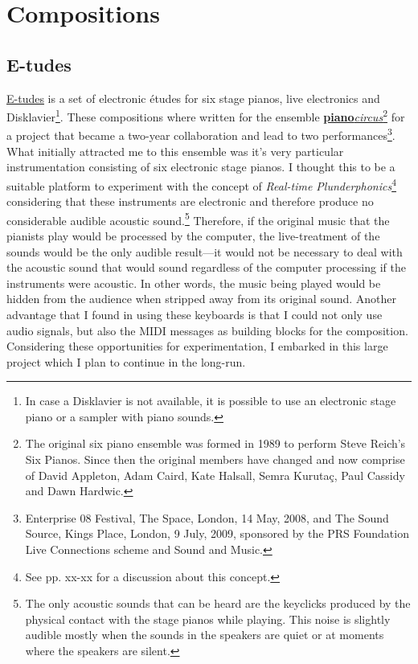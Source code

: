 \hypertarget{chapter5}{}
\chapter{Compositions}

\section{E-tudes}

\href{http://www.ranchonotorious.org/freuben/e-tudes}{E-tudes} is a set of electronic \'{e}tudes for six stage pianos, live electronics and Disklavier\footnote{In case a Disklavier is not available, it is possible to use an electronic stage piano or a sampler with piano sounds.}. These compositions where written for the ensemble \href{http://www.pianocircus.com/}{\textbf{piano}\emph{circus}}\footnote{The original six piano ensemble was formed in 1989 to perform Steve Reich's Six Pianos. Since then the original members have changed and now comprise of David Appleton, Adam Caird, Kate Halsall, Semra Kurutaç, Paul Cassidy and Dawn Hardwic.} for a project that became a two-year collaboration and lead to two performances\footnote{Enterprise 08 Festival, The Space, London, 14 May, 2008, and The Sound Source, Kings Place, London, 9 July, 2009, sponsored by the PRS Foundation Live Connections scheme and Sound and Music.}. What initially attracted me to this ensemble was it's very particular instrumentation consisting of six electronic stage pianos. I thought this to be a suitable platform to experiment with the concept of \emph{Real-time Plunderphonics}\footnote{See pp. xx-xx for a discussion about this concept.} considering that these instruments are electronic and therefore produce no considerable audible acoustic sound.\footnote{The only acoustic sounds that can be heard are the keyclicks produced by the physical contact with the stage pianos while playing. This noise is slightly audible mostly when the sounds in the speakers are quiet or at moments where the speakers are silent.} Therefore, if the original music that the pianists play would be processed by the computer, the live-treatment of the sounds would be the only audible result---it would not be necessary to deal with the acoustic sound that would sound regardless of the computer processing if the instruments were acoustic. In other words, the music being played would be hidden from the audience when stripped away from its original sound. Another advantage that I found in using these keyboards is that I could not only use audio signals, but also the MIDI messages as building blocks for the composition. Considering these opportunities for experimentation, I embarked in this large project which I plan to continue in the long-run. 

